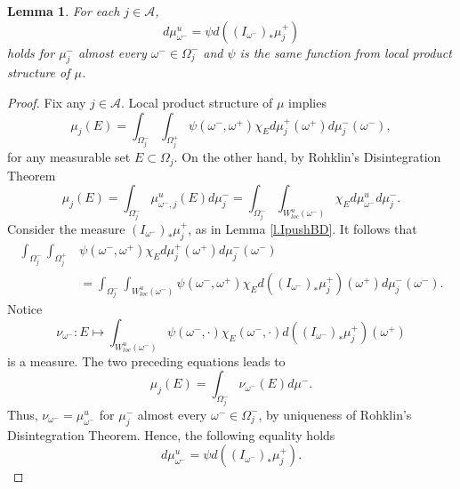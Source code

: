 \documentclass{amsart}
\newtheorem{lemma}{Lemma}
\newcommand{\A}{\mathcal{A}}
\begin{document}
\begin{lemma}\label{l.ujbdp}
    For each $j\in \A$, 
    \[d\mu^u_{\omega^-} = \psi d((I_{\omega^-})_*\mu^+_j)\]
    holds for $\mu^-_j$ almost every $\omega^- \in \Omega^-_j$ and $\psi$ is the same function from local product structure of $\mu$.
\end{lemma}
\begin{proof}
    Fix any $j\in \A$. Local product structure of $\mu$ implies
    \[\mu_j(E) = \int_{\Omega^-_j}\int_{\Omega^+_j} \psi(\omega^-, \omega^+) \chi_E d\mu^+_j(\omega^+) d\mu^-_j(\omega^-),\]
    for any measurable set $E\subset \Omega_j$. On the other hand, by Rohklin's Disintegration Theorem
    \[\mu_j(E) = \int_{\Omega^-_j} \mu^u_{\omega^-,j}(E) d\mu^-_j = \int_{\Omega^-_j} \int_{W^u_{loc}(\omega^-)} \chi_E d\mu^u_{\omega^-} d\mu^-_j.\]
    Consider the measure $(I_{\omega^-})_*\mu^+_j$, as in Lemma \ref{l.IpushBD}. It follows that
    \begin{align*}
        \int_{\Omega^-_j}\int_{\Omega^+_j}& \psi(\omega^-, \omega^+) \chi_E d\mu^+_j(\omega^+) d\mu^-_j(\omega^-) \\
        &= \int_{\Omega^-_j}\int_{W^u_{loc}(\omega^-)} \psi(\omega^-, \omega^+) \chi_E d((I_{\omega^-})_*\mu^+_j)(\omega^+) d\mu^-_j(\omega^-).
    \end{align*}
    Notice 
    \[\nu_{\omega^-}: E\mapsto \int_{W^u_{loc}(\omega^-)} \psi(\omega^-,\cdot) \chi_E(\omega^-,\cdot) d((I_{\omega^-})_*\mu^+_j)(\omega^+)\]
    is a measure. The two preceding equations leads to
    \[\mu_j(E) = \int_{\Omega^-_j} \nu_{\omega^-}(E) d\mu^-.\]
    Thus, $\nu_{\omega^-} = \mu^u_{\omega^-}$ for $\mu^-_j$ almost every $\omega^- \in \Omega^-_j$, by uniqueness of Rohklin's Disintegration Theorem. Hence, the following equality holds
    \[d\mu^u_{\omega^-} = \psi d((I_{\omega^-})_*\mu^+_j).\]
\end{proof}
\end{document}
